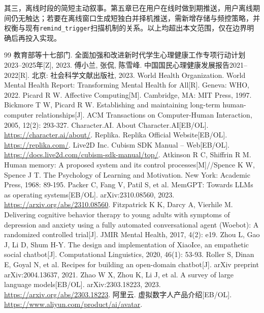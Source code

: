 \documentclass{base}
\begin{document}
其三，离线时段的简短主动叙事。第五章已在用户在线时做到期推送，用户离线期间仍无触达；若要在离线窗口生成短独白并择机推送，需新增存储与频控策略，并权衡与现有\texttt{remind\_trigger}扫描机制的关系。以上均超出本文范围，仅在边界明确后再投入实现。

\clearpage
\begin{thebibliography}{99}
     教育部等十七部门. 全面加强和改进新时代学生心理健康工作专项行动计划2023--2025年[Z], 2023.
     傅小兰, 张侃, 陈雪峰. 中国国民心理健康发展报告2021--2022[R]. 北京: 社会科学文献出版社, 2023.
     World Health Organization. World Mental Health Report: Transforming Mental Health for All[R]. Geneva: WHO, 2022.
     Picard R W. Affective Computing[M]. Cambridge, MA: MIT Press, 1997.
     Bickmore T W, Picard R W. Establishing and maintaining long-term human-computer relationships[J]. ACM Transactions on Computer-Human Interaction, 2005, 12(2): 293-327.
     Character.AI. About Character.AI[EB/OL]. \url{https://character.ai/about/}.
     Replika. Replika Official Website[EB/OL]. \url{https://replika.com/}.
     Live2D Inc. Cubism SDK Manual -- Web[EB/OL]. \url{https://docs.live2d.com/cubism-sdk-manual/top/}.
     Atkinson R C, Shiffrin R M. Human memory: A proposed system and its control processes[M]//Spence K W, Spence J T. The Psychology of Learning and Motivation. New York: Academic Press, 1968: 89-195.
     Packer C, Fang V, Patil S, et al. MemGPT: Towards LLMs as operating systems[EB/OL]. arXiv:2310.08560, 2023. \url{https://arxiv.org/abs/2310.08560}.
     Fitzpatrick K K, Darcy A, Vierhile M. Delivering cognitive behavior therapy to young adults with symptoms of depression and anxiety using a fully automated conversational agent (Woebot): A randomized controlled trial[J]. JMIR Mental Health, 2017, 4(2): e19.
     Zhou L, Gao J, Li D, Shum H-Y. The design and implementation of XiaoIce, an empathetic social chatbot[J]. Computational Linguistics, 2020, 46(1): 53-93.
     Roller S, Dinan E, Goyal N, et al. Recipes for building an open-domain chatbot[J]. arXiv preprint arXiv:2004.13637, 2021.
     Zhao W X, Zhou K, Li J, et al. A survey of large language models[EB/OL]. arXiv:2303.18223, 2023. \url{https://arxiv.org/abs/2303.18223}.
     阿里云. 虚拟数字人产品介绍[EB/OL]. \url{https://www.aliyun.com/product/ai/avatar}.

\end{thebibliography}
\end{document}
